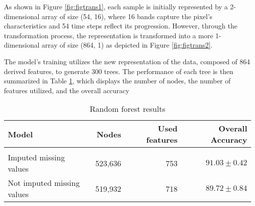 As shown in Figure \ref{fig:figtrans1}, each sample is initially represented by a 2-dimensional array of size (54, 16), where 16 bands capture the pixel's characteristics and 54 time steps reflect its progression. 
However, through the transformation process, the representation is transformed into a more 1-dimensional array of size (864, 1) as depicted in Figure \ref{fig:figtrans2}. 

The model's training utilizes the new representation of the data, composed of 864 derived features, to generate 300 trees.
The performance of each tree is then summarized in Table \ref{tab:rfresults}, which displays the number of nodes, the number of features utilized, and the overall accuracy

\begin{table}[H]
  \centering
    \begin{tabular}{lrrr}
    Model                       & Nodes   & Used features & Overall Accuracy             \\[0.2cm] 
    \hline \\[-0.2cm]
    Imputed missing values      & 523,636  & 753          & $91.03 \pm 0.42$\\
    Not imputed missing values  & 519,932  & 718          & $89.72 \pm 0.84$
    \end{tabular}
  \caption{Random forest results}
  \label{tab:rfresults}
\end{table}